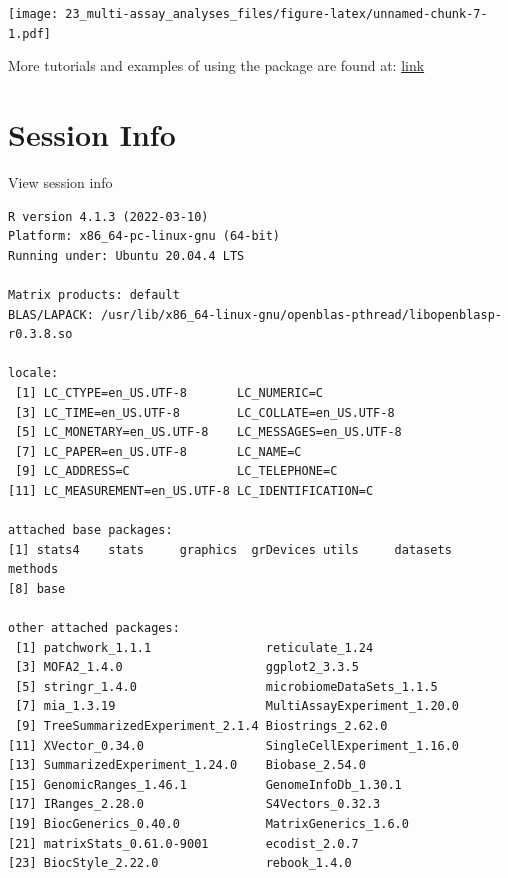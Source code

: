 \documentclass[
]{book}
\begin{document}
\texttt{[image: 23\_multi-assay\_analyses\_files/figure-latex/unnamed-chunk-7-1.pdf]}

More tutorials and examples of using the package are found at: \href{https://biofam.github.io/MOFA2/tutorials.html}{link}

\hypertarget{session-info-9}{%
\section*{Session Info}\label{session-info-9}}

View session info

\begin{verbatim}
R version 4.1.3 (2022-03-10)
Platform: x86_64-pc-linux-gnu (64-bit)
Running under: Ubuntu 20.04.4 LTS

Matrix products: default
BLAS/LAPACK: /usr/lib/x86_64-linux-gnu/openblas-pthread/libopenblasp-r0.3.8.so

locale:
 [1] LC_CTYPE=en_US.UTF-8       LC_NUMERIC=C              
 [3] LC_TIME=en_US.UTF-8        LC_COLLATE=en_US.UTF-8    
 [5] LC_MONETARY=en_US.UTF-8    LC_MESSAGES=en_US.UTF-8   
 [7] LC_PAPER=en_US.UTF-8       LC_NAME=C                 
 [9] LC_ADDRESS=C               LC_TELEPHONE=C            
[11] LC_MEASUREMENT=en_US.UTF-8 LC_IDENTIFICATION=C       

attached base packages:
[1] stats4    stats     graphics  grDevices utils     datasets  methods  
[8] base     

other attached packages:
 [1] patchwork_1.1.1                reticulate_1.24               
 [3] MOFA2_1.4.0                    ggplot2_3.3.5                 
 [5] stringr_1.4.0                  microbiomeDataSets_1.1.5      
 [7] mia_1.3.19                     MultiAssayExperiment_1.20.0   
 [9] TreeSummarizedExperiment_2.1.4 Biostrings_2.62.0             
[11] XVector_0.34.0                 SingleCellExperiment_1.16.0   
[13] SummarizedExperiment_1.24.0    Biobase_2.54.0                
[15] GenomicRanges_1.46.1           GenomeInfoDb_1.30.1           
[17] IRanges_2.28.0                 S4Vectors_0.32.3              
[19] BiocGenerics_0.40.0            MatrixGenerics_1.6.0          
[21] matrixStats_0.61.0-9001        ecodist_2.0.7                 
[23] BiocStyle_2.22.0               rebook_1.4.0                  


\end{verbatim}
\end{document}
